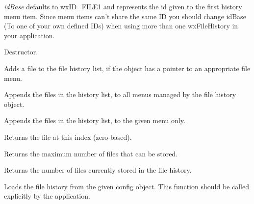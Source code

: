 {\it idBase} defaults to wxID\_FILE1 and represents the id given to the first
history menu item.  Since menu items can't share the same ID you should change
idBase (To one of your own defined IDs) when using more than one wxFileHistory
in your application.



Destructor.



Adds a file to the file history list, if the object has a pointer to an appropriate file menu.

\label{wxfilehistoryaddfilestomenu}


Appends the files in the history list, to all menus managed by the file history object.


Appends the files in the history list, to the given menu only.

\label{wxfilehistorygethistoryfile}


Returns the file at this index (zero-based).



Returns the maximum number of files that can be stored.



Returns the number of files currently stored in the file history.



Loads the file history from the given config object. This function should be called explicitly by the application.


